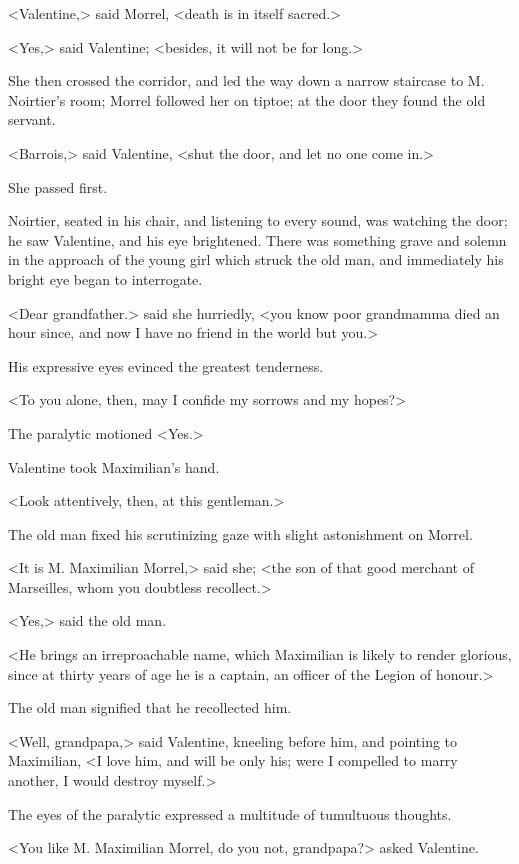  <Valentine,> said Morrel, <death is in itself sacred.> 

 <Yes,> said Valentine; <besides, it will not be for long.> 

 She then crossed the corridor, and led the way down a narrow staircase to M. Noirtier's room; Morrel followed her on tiptoe; at the door they found the old servant. 

 <Barrois,> said Valentine, <shut the door, and let no one come in.> 

 She passed first. 

 Noirtier, seated in his chair, and listening to every sound, was watching the door; he saw Valentine, and his eye brightened. There was something grave and solemn in the approach of the young girl which struck the old man, and immediately his bright eye began to interrogate.  
 
 
 <Dear grandfather.> said she hurriedly, <you know poor grandmamma died an hour since, and now I have no friend in the world but you.> 

 His expressive eyes evinced the greatest tenderness. 

 <To you alone, then, may I confide my sorrows and my hopes?> 

 The paralytic motioned <Yes.> 

 Valentine took Maximilian's hand. 

 <Look attentively, then, at this gentleman.> 

 The old man fixed his scrutinizing gaze with slight astonishment on Morrel. 

 <It is M. Maximilian Morrel,> said she; <the son of that good merchant of Marseilles, whom you doubtless recollect.> 

 <Yes,> said the old man. 

 <He brings an irreproachable name, which Maximilian is likely to render glorious, since at thirty years of age he is a captain, an officer of the Legion of honour.> 

 The old man signified that he recollected him. 

 <Well, grandpapa,> said Valentine, kneeling before him, and pointing to Maximilian, <I love him, and will be only his; were I compelled to marry another, I would destroy myself.> 

 The eyes of the paralytic expressed a multitude of tumultuous thoughts. 

 <You like M. Maximilian Morrel, do you not, grandpapa?> asked Valentine. 

